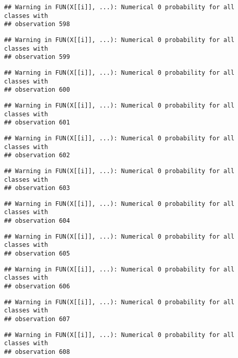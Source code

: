\documentclass[
]{article}
\begin{document}
\begin{verbatim}
## Warning in FUN(X[[i]], ...): Numerical 0 probability for all classes with
## observation 598
\end{verbatim}

\begin{verbatim}
## Warning in FUN(X[[i]], ...): Numerical 0 probability for all classes with
## observation 599
\end{verbatim}

\begin{verbatim}
## Warning in FUN(X[[i]], ...): Numerical 0 probability for all classes with
## observation 600
\end{verbatim}

\begin{verbatim}
## Warning in FUN(X[[i]], ...): Numerical 0 probability for all classes with
## observation 601
\end{verbatim}

\begin{verbatim}
## Warning in FUN(X[[i]], ...): Numerical 0 probability for all classes with
## observation 602
\end{verbatim}

\begin{verbatim}
## Warning in FUN(X[[i]], ...): Numerical 0 probability for all classes with
## observation 603
\end{verbatim}

\begin{verbatim}
## Warning in FUN(X[[i]], ...): Numerical 0 probability for all classes with
## observation 604
\end{verbatim}

\begin{verbatim}
## Warning in FUN(X[[i]], ...): Numerical 0 probability for all classes with
## observation 605
\end{verbatim}

\begin{verbatim}
## Warning in FUN(X[[i]], ...): Numerical 0 probability for all classes with
## observation 606
\end{verbatim}

\begin{verbatim}
## Warning in FUN(X[[i]], ...): Numerical 0 probability for all classes with
## observation 607
\end{verbatim}

\begin{verbatim}
## Warning in FUN(X[[i]], ...): Numerical 0 probability for all classes with
## observation 608
\end{verbatim}
\end{document}
